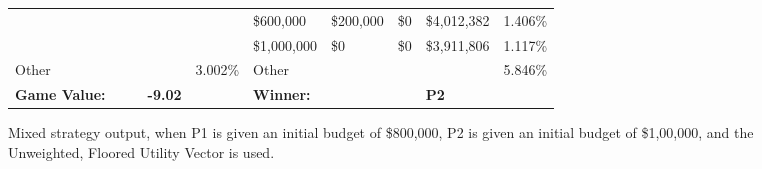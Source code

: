 \documentclass[11pt]{article}
\begin{document}
\begin{figure}
\begin{tabular}{ |p{1.0cm}p{1.0cm}p{1.0cm}p{2.0cm}|p{1.0cm}||p{1.0cm}p{1.0cm}p{1.0cm}p{2.0cm}|p{1.0cm}|}
& & & &                                            & \$600,000 & \$200,000 & \$0 & \$4,012,382 & 1.406\% \\
& & & &                                            & \$1,000,000 & \$0 & \$0 & \$3,911,806 & 1.117\% \\
\hline
Other & & & & 3.002\%                               & Other & & & & 5.846\% \\
\hline
\small \textbf{Game Value:} &&& \small \textbf{-9.02} && \small \textbf{Winner:} &&& \small \textbf{P2}&\\
\hline
\end{tabular}
\caption{Mixed strategy output, when P1 is given an initial budget of \$800,000, P2 is given an initial budget of \$1,00,000, and the Unweighted, Floored Utility Vector is used.}
\label{8v10table.1}
\end{figure}
\end{document}
